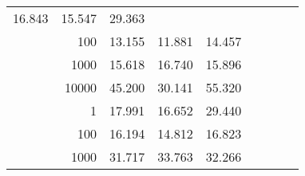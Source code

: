 \begin{table}
\begin{tabular}{rrrrrrrrr}
						
							    
							    
	                           16.843 & 15.547 & 29.363  \\
	                
	            
					 &  
					 
					\multirow{ 1 }{*}{ 100 } &
					
						
							    
							    
	                           13.155 & 11.881 & 14.457  \\
	                
	            
					 &  
					 
					\multirow{ 1 }{*}{ 1000 } &
					
						
							    
							    
	                           15.618 & 16.740 & 15.896  \\
	                
	            
					 &  
					 
					\multirow{ 1 }{*}{ 10000 } &
					
						
							    
							    
	                           45.200 & 30.141 & 55.320  \\
	                
	            
	        
				\noalign{\smallskip}\hline
				\multirow{ 4 }{*}{ 1000000 } &
				
					
					 
					\multirow{ 1 }{*}{ 1 } &
					
						
							    
							    
	                           17.991 & 16.652 & 29.440  \\
	                
	            
					 &  
					 
					\multirow{ 1 }{*}{ 100 } &
					
						
							    
							    
	                           16.194 & 14.812 & 16.823  \\
	                
	            
					 &  
					 
					\multirow{ 1 }{*}{ 1000 } &
					
						
							    
							    
	                           31.717 & 33.763 & 32.266  \\
	                

\end{tabular}
\end{table}
